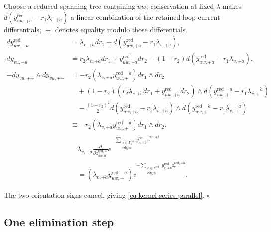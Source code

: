 \documentclass[11pt]{article}
\numberwithin{equation}{section}
\numberwithin{figure}{section}
\numberwithin{table}{section}
\begin{document}
\begin{proofbox}
Choose a reduced spanning tree containing $uw$; conservation at fixed $\lambda$ makes $d(y_{uw,+\dot a}^{\mathrm{red}}-r_1\lambda_{v,+\dot a})$ a linear combination of the retained loop-current differentials; $\equiv$ denotes equality modulo those differentials.
\begin{equation*}
\begin{aligned}
dy_{uw,+\dot a}^{\mathrm{red}}
&=\lambda_{v,+\dot a}dr_1
+d\!\left(y_{uw,+\dot a}^{\mathrm{red}}-r_1\lambda_{v,+\dot a}\right),\\
dy_{vu,+\dot a}
&=r_2\lambda_{v,+\dot a}dr_1+y_{uw,+\dot a}^{\mathrm{red}}dr_2
-(1-r_2)d\!\left(y_{uw,+\dot a}^{\mathrm{red}}-r_1\lambda_{v,+\dot a}\right),\\
-dy_{vu,+\dot+}\wedge dy_{vu,+\dot-}
&=-r_2\left(\lambda_{v,+\dot a}y_{uw,+}^{\mathrm{red}}{}^{\dot a}\right)
 dr_1\wedge dr_2\\
&\quad+(1-r_2)\left(r_2\lambda_{v,+\dot a}dr_1+y_{uw,+\dot a}^{\mathrm{red}}dr_2\right)
 \wedge d\!\left(y_{uw,+}^{\mathrm{red}}{}^{\dot a}-r_1\lambda_{v,+}{}^{\dot a}\right)\\
&\quad-\frac{(1-r_2)^2}{2}
 d\!\left(y_{uw,+\dot a}^{\mathrm{red}}-r_1\lambda_{v,+\dot a}\right)
 \wedge d\!\left(y_{uw,+}^{\mathrm{red}}{}^{\dot a}-r_1\lambda_{v,+}{}^{\dot a}\right)\\
&\equiv-r_2\left(\lambda_{v,+\dot a}y_{uw,+}^{\mathrm{red}}{}^{\dot a}\right)
 dr_1\wedge dr_2.
\end{aligned}
\end{equation*}
\begin{equation*}
\begin{aligned}
&\lambda_{v,+\dot a}\frac{\partial}{\partial z_{uw,\dot a}^{\mathrm{red},+}}
e^{-\sum_{\substack{e\in\Gamma_1^{\mathrm{red}}\\\mathrm{edges}}}y_{e,+\dot b}^{\mathrm{red}}z_e^{\mathrm{red},+\dot b}}\\
&=(\lambda_{v,+\dot a}y_{uw,+}^{\mathrm{red}}{}^{\dot a})
e^{-\sum_{\substack{e\in\Gamma_1^{\mathrm{red}}\\\mathrm{edges}}}y_{e,+\dot b}^{\mathrm{red}}z_e^{\mathrm{red},+\dot b}}.
\end{aligned}
\end{equation*}

The two orientation signs cancel, giving \eqref{eq-kernel-series-parallel}. $\square$
\end{proofbox}

\subsection{One elimination step}\label{sec-fan-step}
\end{document}
